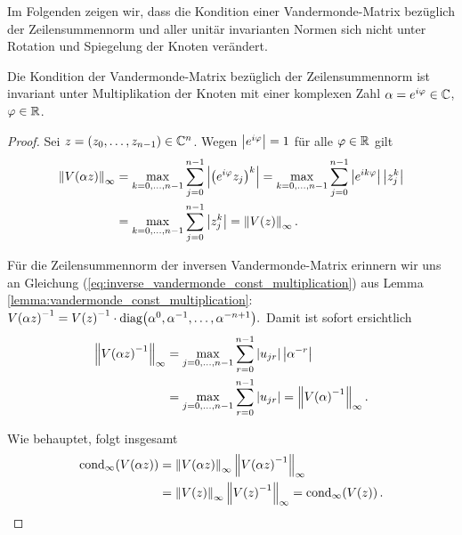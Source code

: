 Im Folgenden zeigen wir, dass die Kondition einer Vandermonde-Matrix bezüglich
der Zeilensummennorm und aller unitär invarianten Normen sich nicht unter
Rotation und Spiegelung der Knoten verändert.


\begin{lemma}
    \label{lemma:vandermonde_rotation_invariance}
    Die Kondition der Vandermonde-Matrix bezüglich der Zeilensummennorm ist
    invariant unter Multiplikation der Knoten mit einer komplexen Zahl
    $\alpha = e^{i\varphi} \in \mathbb{C}$, $\varphi \in \mathbb{R}$.
\end{lemma}
\begin{proof}
    Sei $z = (z_0, \dots, z_{n-1}) \in \mathbb{C}^n$.
    Wegen $\left\lvert e^{i\varphi} \right\rvert = 1$ für alle $\varphi \in \mathbb{R}$ gilt
    \[
        \begin{split}
            \left\lVert V \! \left( \alpha z \right) \right\rVert_\infty
            &= \max_{k=0, \dots, n-1} \sum_{j=0}^{n-1} \left\lvert \left(e^{i\varphi} z_j\right)^k \right\rvert
            = \max_{k=0, \dots, n-1} \sum_{j=0}^{n-1} \left\lvert e^{ik\varphi} \right\rvert \left\lvert z_j^k \right\rvert\\
            &= \max_{k=0, \dots, n-1} \sum_{j=0}^{n-1} \left\lvert z_j^k \right\rvert
            = \left\lVert V \! \left( z \right) \right\rVert_\infty.
        \end{split}
    \]

    \noindent Für die Zeilensummennorm der inversen Vandermonde-Matrix erinnern
    wir uns an Gleichung
    (\ref{eq:inverse_vandermonde_const_multiplication})
    aus Lemma \ref{lemma:vandermonde_const_multiplication}:
        $V \! \left( \alpha z \right)^{-1}
        = V \! \left( z \right)^{-1} \cdot \text{diag$ \left( \alpha^0, \alpha^{-1}, \dots, \alpha^{-n+1} \right)$}.$
    Damit ist sofort ersichtlich
    \[
        \begin{split}
            \left\lVert V \! \left( \alpha z \right)^{-1} \right\rVert_\infty
            &= \max_{j=0, \dots, n-1} \sum_{r=0}^{n-1} \left\lvert u_{jr} \right\rvert \left\lvert \alpha^{-r} \right\rvert\\
            &= \max_{j=0, \dots, n-1} \sum_{r=0}^{n-1} \left\lvert u_{jr} \right\rvert
            = \left\lVert V \! \left( \alpha \right)^{-1} \right\rVert_\infty.
        \end{split}
    \]

    \noindent Wie behauptet, folgt insgesamt
    \[
        \begin{split}
            \cond[\infty]{\Vand{\alpha z}}
            &= \norm{\Vand{\alpha z}}_\infty \norm{\Vand{\alpha z}^{-1}}_\infty\\
            &= \norm{\Vand{z}}_\infty \norm{\Vand{z}^{-1}}_\infty
            = \cond[\infty]{\Vand{z}}.
        \end{split}
    \]
\end{proof}

